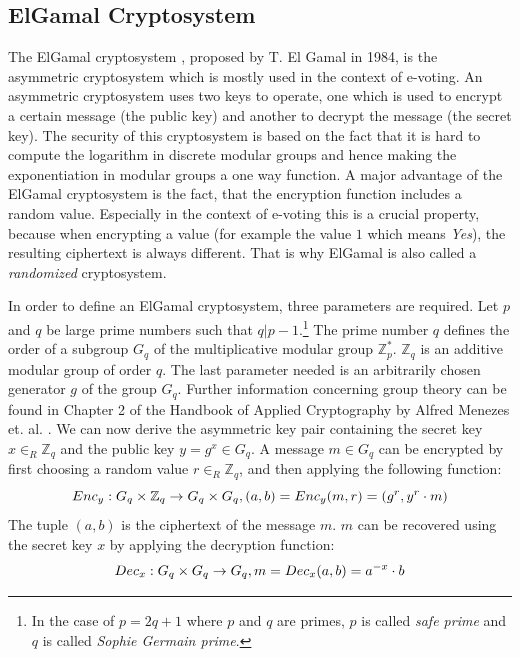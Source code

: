 \documentclass[numbers=noenddot, abstract=on, a4paper, headsepline,
footsepline, oneside, draft=off]{scrreprt}
\begin{document}
\subsection{ElGamal Cryptosystem}
\label{sec:elgamal}
The ElGamal cryptosystem \cite{EG84}, proposed by T. El Gamal in 1984, is the
asymmetric cryptosystem which is mostly used in the context of e-voting. An
asymmetric cryptosystem uses two keys to operate, one which is used to encrypt a
certain message (the public key) and another to decrypt the message (the secret
key). The security of this cryptosystem is based on the fact that it is hard to
compute the logarithm in discrete modular groups and hence making the
exponentiation in modular groups a one way function. A major advantage of the
ElGamal cryptosystem is the fact, that the encryption function includes a random
value. Especially in the context of e-voting this is a crucial property, because
when encrypting a value (for example the value $1$ which means \textit{Yes}),
the resulting ciphertext is always different. That is why ElGamal is also called
a \textit{randomized} cryptosystem.

In order to define an ElGamal cryptosystem, three parameters are required. Let
$p$ and $q$ be large prime numbers such that $q|p-1$.\footnote{In the case of
$p=2q+1$ where $p$ and $q$ are primes, $p$ is called \emph{safe prime} and $q$
is called \emph{Sophie Germain prime}.}
The prime number $q$ defines the order of a subgroup $G_q$ of the multiplicative
modular group $\mathbb{Z}^*_p$. $\mathbb{Z}_q$ is an additive modular group of order $q$. The
last parameter needed is an arbitrarily chosen generator $g$ of the group $G_q$.
Further information concerning group theory can be found in Chapter 2 of the
Handbook of Applied Cryptography by Alfred Menezes et. al. \cite{book:hac}. We
can now derive the asymmetric key pair containing the secret key $x \in_R
\mathbb{Z}_q$ and the public key $y=g^x \in G_q$. A message $m \in G_q$ can be
encrypted by first choosing a random value $r \in_R \mathbb{Z}_q$, and then
applying the following function:
\begin{equation}
Enc_y : G_q \times \mathbb{Z}_q \rightarrow G_q \times G_q,
(a, b)=Enc_y(m, r)=(g^r, y^r \cdot m) \notag
\end{equation}
The tuple $(a, b)$ is the ciphertext of the message $m$. $m$ can be recovered using the secret key $x$
by applying the decryption function:
\begin{equation}
Dec_x : G_q \times G_q \rightarrow G_q,
m=Dec_x(a, b)=a^{-x} \cdot b \notag
\end{equation}
\end{document}

